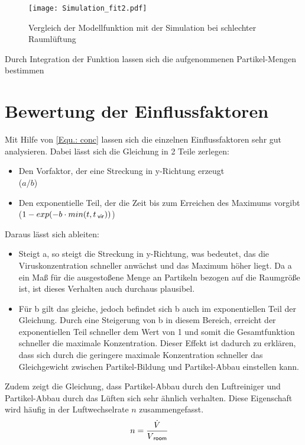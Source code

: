 \documentclass[12pt,a4paper,bibtotocnumbered,liststotocnumbered]{scrreprt}
\begin{document}
\begin{figure}[H]
\begin{center}
\texttt{[image: Simulation\_fit2.pdf]}
\caption{Vergleich der Modellfunktion mit der Simulation bei schlechter Raumlüftung}
\label{Abb: Modell schlecht}
\end{center}
\end{figure}

Durch Integration der Funktion lassen sich die aufgenommenen Partikel-Mengen bestimmen


\section{Bewertung der Einflussfaktoren}
Mit Hilfe von \autoref{Equ.: conc} lassen sich die einzelnen Einflussfaktoren sehr gut analysieren. Dabei lässt sich die Gleichung in 2 Teile zerlegen:
\begin{itemize}
\item Den Vorfaktor, der eine Streckung in y-Richtung erzeugt \\ ($a/b$)
\item Den exponentielle Teil, der die Zeit bis zum Erreichen des Maximums vorgibt \\ ($1 - exp(-b\cdot min(t,t_{\: \mathsf{vir}}))$)
\end{itemize}
Daraus lässt sich ableiten:
\begin{itemize}
\item Steigt a, so steigt die Streckung in y-Richtung, was bedeutet, das die Viruskonzentration schneller anwächst und das Maximum höher liegt. Da a ein Maß für die ausgestoßene Menge an Partikeln bezogen auf die Raumgröße ist, ist dieses Verhalten auch durchaus plausibel.
\item Für b gilt das gleiche, jedoch befindet sich b auch im exponentiellen Teil der Gleichung. Durch eine Steigerung von b in diesem Bereich, erreicht der exponentiellen Teil schneller dem Wert von 1 und somit die Gesamtfunktion schneller die maximale Konzentration. Dieser Effekt ist dadurch zu erklären, dass sich durch die geringere maximale Konzentration schneller das Gleichgewicht zwischen Partikel-Bildung und Partikel-Abbau einstellen kann.
\end{itemize}
Zudem zeigt die Gleichung, dass Partikel-Abbau durch den Luftreiniger und Partikel-Abbau durch das Lüften sich sehr ähnlich verhalten. Diese Eigenschaft wird häufig in der Luftwechselrate $n$ zusammengefasst.
\begin{align}
n &=  \frac{\dot{V}}{V_{\: \mathsf{room}}}
\end{align}
\end{document}
